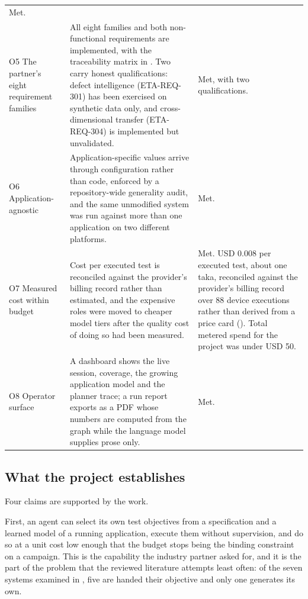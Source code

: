 \begin{xltabular}{\textwidth}{@{}>{\hsize}Y>{\hsize}Y>{\hsize}Y@{}}
    Met. \\
  \addlinespace
  O5 The partner's eight requirement families &
    All eight families and both non-functional requirements are implemented, with the traceability matrix in . Two carry honest qualifications: defect intelligence (ETA-REQ-301) has been exercised on synthetic data only, and cross-dimensional transfer (ETA-REQ-304) is implemented but unvalidated. &
    Met, with two qualifications. \\
  \addlinespace
  O6 Application-agnostic &
    Application-specific values arrive through configuration rather than code, enforced by a repository-wide generality audit, and the same unmodified system was run against more than one application on two different platforms. &
    Met. \\
  \addlinespace
  O7 Measured cost within budget &
    Cost per executed test is reconciled against the provider's billing record rather than estimated, and the expensive roles were moved to cheaper model tiers after the quality cost of doing so had been measured. &
    Met. USD 0.008 per executed test, about one taka, reconciled against the provider's billing record over 88 device executions rather than derived from a price card (). Total metered spend for the project was under USD 50. \\
  \addlinespace
  O8 Operator surface &
    A dashboard shows the live session, coverage, the growing application model and the planner trace; a run report exports as a PDF whose numbers are computed from the graph while the language model supplies prose only. &
    Met. \\
\end{xltabular}
\endgroup

\subsection*{What the project establishes}

Four claims are supported by the work.

First, an agent can select its own test objectives from a specification and a
learned model of a running application, execute them without supervision, and
do so at a unit cost low enough that the budget stops being the binding
constraint on a campaign. This is the capability the industry partner asked for,
and it is the part of the problem that the reviewed literature attempts least
often: of the seven systems examined in , five are handed
their objective and only one generates its own.

